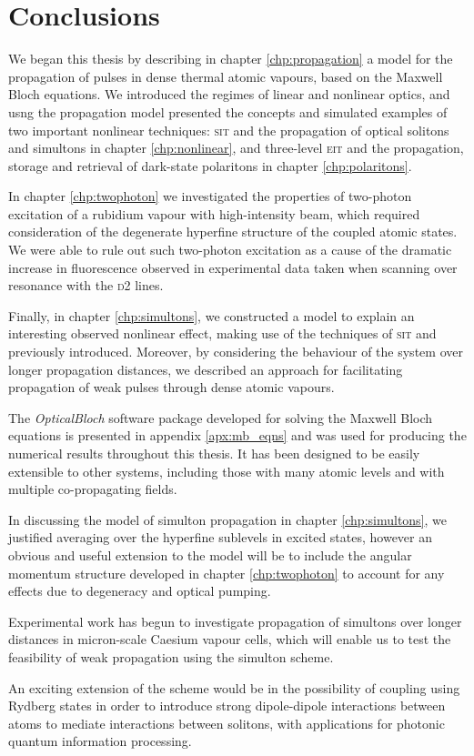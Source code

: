 \chapter[Conclusions]
  {Conclusions}
  \label{chp:conclusions}

  We began this thesis by describing in chapter \ref{chp:propagation} a model
  for the propagation of pulses in dense thermal atomic vapours, based on the
  Maxwell Bloch equations. We introduced the regimes of linear and nonlinear
  optics, and usng the propagation model presented the concepts and simulated
  examples of two important nonlinear techniques: \textsc{sit} and the
  propagation of optical solitons and simultons in chapter \ref{chp:nonlinear},
  and three-level \textsc{eit} and the propagation, storage and retrieval of
  dark-state polaritons in chapter \ref{chp:polaritons}.

  In chapter \ref{chp:twophoton} we investigated the properties of two-photon
  excitation of a rubidium vapour with high-intensity beam, which required
  consideration of the degenerate hyperfine structure of the coupled atomic
  states. We were able to rule out such two-photon excitation as a cause of the
  dramatic increase in fluorescence observed in experimental data taken when
  scanning over resonance with the \textsc{d2} lines.

  Finally, in chapter \ref{chp:simultons}, we constructed a model to explain an
  interesting observed nonlinear effect, making use of the techniques of
  \textsc{sit} and  previously introduced. Moreover, by considering
  the behaviour of the system over longer propagation distances, we described an
  approach for facilitating propagation of weak pulses through dense atomic
  vapours.

  The \textit{OpticalBloch} software package developed for solving the Maxwell
  Bloch equations is presented in appendix \ref{apx:mb_eqns} and was used for
  producing the numerical results throughout this thesis. It has been designed
  to be easily extensible to other systems, including those with many atomic
  levels and with multiple co-propagating fields.

  In discussing the model of simulton propagation in chapter
  \ref{chp:simultons}, we justified averaging over the hyperfine sublevels in
  excited states, however an obvious and useful extension to the model will be
  to include the angular momentum structure developed in chapter
  \ref{chp:twophoton} to account for any effects due to degeneracy and optical
  pumping.

  Experimental work has begun to investigate propagation of simultons over
  longer distances in micron-scale Caesium vapour cells, which will enable us to
  test the feasibility of weak propagation using the simulton scheme. 

  An exciting extension of the scheme would be in the possibility of coupling
  using Rydberg states in order to introduce strong dipole-dipole interactions
  between atoms to mediate interactions between solitons, with applications for
  photonic quantum information
  processing.\cite{Maxwell2013,Maghrebi2015,Peyronel2012}
